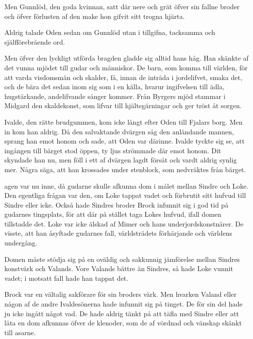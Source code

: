 Men Gunnlöd, den goda kvinnan, satt där nere och grät
öfver sin fallne broder och öfver förlusten af den make hon gifvit sitt
trogna hjärta.

Aldrig talade Oden sedan om Gunnlöd utan i tillgifna, tacksamma och
själfförebrående ord.

Men öfver den lyckligt utförda bragden gladde sig alltid hans håg. Han
skänkte af det vunna mjödet till gudar och människor. De barn, som komma
till världen, för att varda visdomsmän och skalder, få, innan de inträda
i jordelifvet, smaka det, och de bära det sedan inom sig som i en källa,
hvarur ingifvelsen till ädla, hugstärkande, andelifvande sånger kommer.
Från Byrgers mjöd stammar i Midgard den skaldekonst, som lifvar till
hjältegärningar och ger tröst åt sorgen.

Ivalde, den rätte brudgummen, kom icke långt efter Oden till Fjalars
borg. Men in kom han aldrig. Då den salvaktande dvärgen såg den
anländande mannen, sprang han emot honom och sade, att Oden var därinne.
Ivalde tyckte sig se, att ingången till bärget stod öppen, ty ljus
strömmade där emot honom. Dit skyndade han nu, men föll i ett af dvärgen
lagdt försåt och vardt aldrig synlig mer. Några säga, att han krossades
under stenblock, som nedvräktes från bärget.

\endSecII


\dropcapD agen var nu inne, då gudarne skulle afkunna dom i målet mellan Sindre
och Loke. Den egentliga frågan var den, om Loke tappat vadet och
förbrutit sitt hufvud till Sindre eller icke. Också hade Sindres broder
Brock infunnit sig i god tid på gudarnes tingsplats, för att där på
stället taga Lokes hufvud, ifall domen tillstadde det. Loke var icke
älskad af Mimer och hans underjordskonstnärer. De visste, att han
åsyftade gudarnes fall, världsträdets förhärjande och världens
undergång.

Domen måste stödja sig på en oväldig och sakkunnig jämförelse mellan
Sindres konstvärk och Valands. Vore
Valands
bättre än Sindres, så hade Loke vunnit vadet; i motsatt fall hade han
tappat det.

Brock var en vältalig sakförare för sin broders värk. Men hvarken Valand
eller någon af de andre Ivaldesönerna hade infunnit sig på tinget. De
för sin del hade ju icke ingått något vad. De hade aldrig tänkt på att
täfla med Sindre eller att låta en dom afkunnas öfver de klenoder, som
de af vördnad och vänskap skänkt till asarne.

